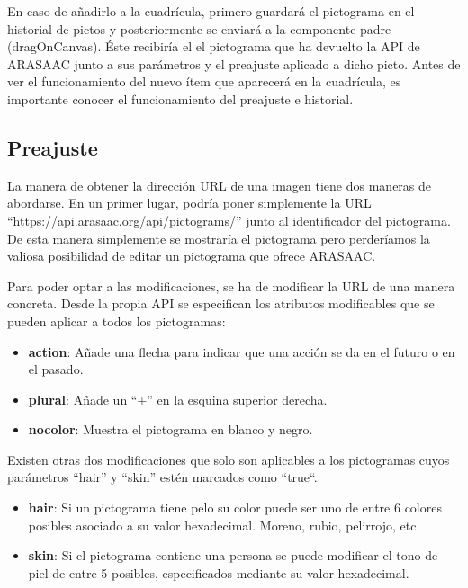 En caso de añadirlo a la cuadrícula, primero guardará el pictograma en el historial de pictos y posteriormente se enviará a la componente padre (dragOnCanvas).  Éste recibiría el el pictograma que ha devuelto la API de ARASAAC junto a sus parámetros y el preajuste aplicado a dicho picto. Antes de ver el funcionamiento del nuevo ítem que aparecerá en la cuadrícula, es importante conocer el funcionamiento del preajuste e historial.


\subsection{Preajuste}
\label{preajuste}

La manera de obtener la dirección URL de una imagen tiene dos maneras de abordarse. En un primer lugar, podría poner simplemente la URL “https://api.arasaac.org/api/pictograms/” junto al identificador del pictograma. De esta manera simplemente se mostraría el pictograma pero perderíamos la valiosa posibilidad de editar un pictograma que ofrece ARASAAC.

Para poder optar a las modificaciones, se ha de modificar la URL de una manera concreta. Desde la propia API se especifican los atributos modificables que se pueden aplicar a todos los pictogramas:  


\begin{itemize}
	\item \textbf{action}: Añade una flecha para indicar que una acción se da en el futuro o en el pasado.
	\item \textbf{plural}: Añade un “+” en la esquina superior derecha.
	\item \textbf{nocolor}: Muestra el pictograma en blanco y negro.
	
\end{itemize}

Existen otras dos modificaciones que solo son aplicables a los pictogramas cuyos parámetros “hair” y “skin” estén marcados como “true“.


\begin{itemize}
	\item \textbf{hair}: Si un pictograma tiene pelo su color puede ser uno de entre 6 colores posibles asociado a su valor hexadecimal. Moreno, rubio, pelirrojo, etc.
	
	\item \textbf{skin}: Si el pictograma contiene una persona se puede modificar el tono de piel de entre 5 posibles, especificados mediante su valor hexadecimal.
	
\end{itemize}

